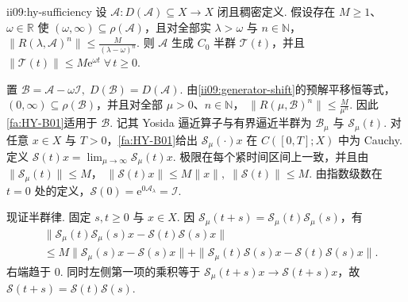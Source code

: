 \begin{FAProposition}{ii09:hy-sufficiency}
设 \(\displaystyle \mathcal A:D(\mathcal A)\subseteq X\to X\)
闭且稠密定义. 假设存在 \(\displaystyle M\geqslant1\)、\(\displaystyle\omega\in\mathbb R\) 使 \(\displaystyle(\omega,\infty)\subseteq\rho(\mathcal A)\)，且对全部实 \(\displaystyle\lambda>\omega\) 与 \(\displaystyle n\in\mathbb N\)， \(\displaystyle \|R(\lambda,\mathcal A)^n\| \leqslant \frac{M}{(\lambda-\omega)^n}.\)
则 \(\displaystyle\mathcal A\) 生成 \(\displaystyle C_0\) 半群 \(\displaystyle\mathcal T(t)\)，并且 \(\displaystyle \|\mathcal T(t)\| \leqslant M\mathrm{e}^{\omega t} \; \forall\,t\geqslant0.\)
\end{FAProposition}

\begin{FAProof}
置 \(\displaystyle \mathcal B=\mathcal A-\omega\mathcal I, \; D(\mathcal B)=D(\mathcal A).\)
由\autoref{ii09:generator-shift}的预解平移恒等式，\(\displaystyle(0,\infty)\subseteq\rho(\mathcal B)\)，并且对全部 \(\displaystyle\mu>0\)、\(\displaystyle n\in\mathbb N\)， \(\displaystyle \|R(\mu,\mathcal B)^n\| \leqslant \frac{M}{\mu^n}.\)
因此\autoref{fa:HY-B01}适用于 \(\displaystyle\mathcal B\). 记其 Yosida 逼近算子与有界逼近半群为 \(\displaystyle\mathcal B_\mu\) 与 \(\displaystyle\mathcal S_\mu(t)\). 对任意 \(\displaystyle x\in X\) 与 \(\displaystyle T>0\)，\autoref{fa:HY-B01}给出 \(\displaystyle\mathcal S_\mu(\cdot)x\) 在 \(\displaystyle C([0,T];X)\) 中为 Cauchy. 定义 \(\displaystyle \mathcal S(t)x=\lim_{\mu\to\infty}\mathcal S_\mu(t)x\). 极限在每个紧时间区间上一致，并且由 \(\displaystyle\|\mathcal S_\mu(t)\|\leqslant M\)， \(\displaystyle \|\mathcal S(t)x\| \leqslant M\|x\|, \; \|\mathcal S(t)\|\leqslant M.\)
由指数级数在 \(\displaystyle t=0\) 处的定义，\(\displaystyle\mathcal S(0)=\mathrm e^{0\mathcal A_\lambda}=\mathcal I\).

现证半群律. 固定 \(\displaystyle s,t\geqslant0\) 与 \(\displaystyle x\in X\). 因 \(\displaystyle\mathcal S_\mu(t+s)=\mathcal S_\mu(t)\mathcal S_\mu(s)\)，有
\[
\begin{aligned}
&\|\mathcal S_\mu(t)\mathcal S_\mu(s)x-\mathcal S(t)\mathcal S(s)x\|\\
&\leqslant
M\|\mathcal S_\mu(s)x-\mathcal S(s)x\|
+
\|\mathcal S_\mu(t)\mathcal S(s)x-\mathcal S(t)\mathcal S(s)x\|.
\end{aligned}
\]
右端趋于 \(\displaystyle0\). 同时左侧第一项的乘积等于 \(\displaystyle\mathcal S_\mu(t+s)x\to\mathcal S(t+s)x\)，故 \(\displaystyle \mathcal S(t+s)=\mathcal S(t)\mathcal S(s).\)


\end{FAProof}
